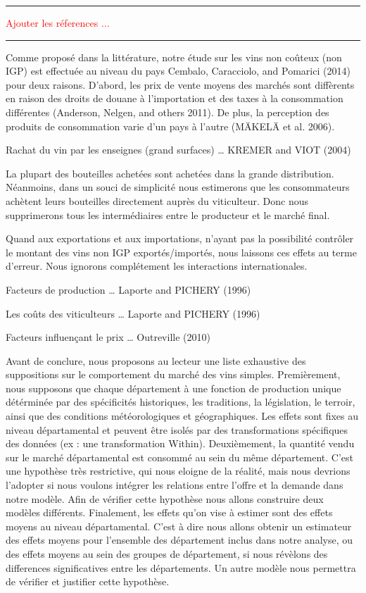 \documentclass[11pt,]{article}
\begin{document}
\noindent

\rule[0.5ex]{\linewidth}{1pt}

\textcolor{red}{Ajouter les réferences ...}

\noindent

\rule[0.5ex]{\linewidth}{1pt}

Comme proposé dans la littérature, notre étude sur les vins non coûteux
(non IGP) est effectuée au niveau du pays Cembalo, Caracciolo, and
Pomarici (2014) pour deux raisons. D'abord, les prix de vente moyens des
marchés sont diffèrents en raison des droits de douane à l'importation
et des taxes à la consommation différentes (Anderson, Nelgen, and others
2011). De plus, la perception des produits de consommation varie d'un
pays à l'autre (MÄKELÄ et al. 2006).

Rachat du vin par les enseignes (grand surfaces) \ldots{} KREMER and
VIOT (2004)

La plupart des bouteilles achetées sont achetées dans la grande
distribution. Néanmoins, dans un souci de simplicité nous estimerons que
les consommateurs achètent leurs bouteilles directement auprès du
viticulteur. Donc nous supprimerons tous les intermédiaires entre le
producteur et le marché final.

Quand aux exportations et aux importations, n'ayant pas la possibilité
contrôler le montant des vins non IGP exportés/importés, nous laissons
ces effets au terme d'erreur. Nous ignorons complétement les
interactions internationales.

Facteurs de production \ldots{} Laporte and PICHERY (1996)

Les coûts des viticulteurs \ldots{} Laporte and PICHERY (1996)

Facteurs influençant le prix \ldots{} Outreville (2010)

Avant de conclure, nous proposons au lecteur une liste exhaustive des
suppositions sur le comportement du marché des vins simples.
Premièrement, nous supposons que chaque département à une fonction de
production unique détérminée par des spécificités historiques, les
traditions, la législation, le terroir, ainsi que des conditions
météorologiques et géographiques. Les effets sont fixes au niveau
départamental et peuvent être isolés par des transformations spécifiques
des données (ex : une transformation Within). Deuxièmement, la quantité
vendu sur le marché départamental est consommé au sein du même
département. C'est une hypothèse très restrictive, qui nous eloigne de
la réalité, mais nous devrions l'adopter si nous voulons intégrer les
relations entre l'offre et la demande dans notre modèle. Afin de
vérifier cette hypothèse nous allons construire deux modèles différents.
Finalement, les effets qu'on vise à estimer sont des effets moyens au
niveau départamental. C'est à dire nous allons obtenir un estimateur des
effets moyens pour l'ensemble des département inclus dans notre analyse,
ou des effets moyens au sein des groupes de département, si nous
révèlons des differences significatives entre les départements. Un autre
modèle nous permettra de vérifier et justifier cette hypothèse.
\end{document}
